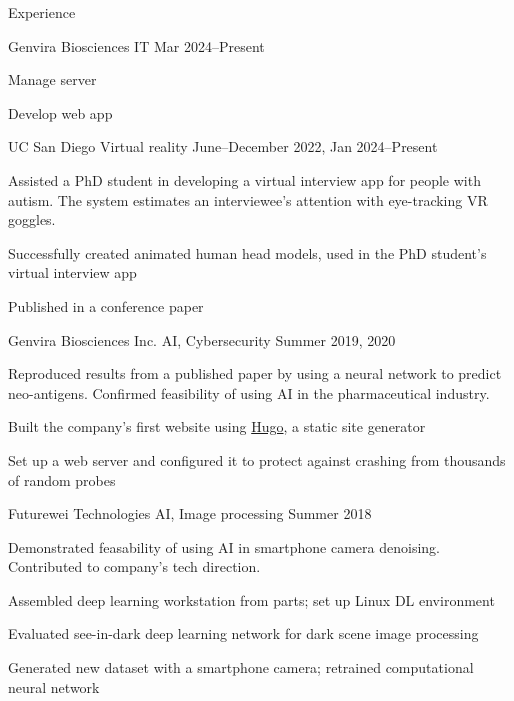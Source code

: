 	\begin{rSection}{Experience}

		\begin{rSubsection}{Genvira Biosciences} {IT} {Mar 2024--Present} %
			\item Manage server
			\item Develop web app
		\end{rSubsection}

		\begin{rSubsection}{UC San Diego} {Virtual reality} {June--December 2022, Jan 2024--Present} %
			\item Assisted a PhD student in developing a virtual interview app for people with autism. The system estimates an interviewee's attention with eye-tracking VR goggles.
			\item Successfully created animated human head models, used in the PhD student's virtual interview app
			\item Published in a conference paper
		\end{rSubsection}

		\begin{rSubsection}{Genvira Biosciences Inc.} {AI, Cybersecurity} {Summer 2019, 2020}
			\item Reproduced results from a published paper by using a neural network to predict neo-antigens. Confirmed feasibility of using AI in the pharmaceutical industry.
			\item Built the company's first website using \href{https://gohugo.io/}{Hugo}, a static site generator
			\item Set up a web server and configured it to protect against crashing from thousands of random probes
		\end{rSubsection}

		\begin{rSubsection}{Futurewei Technologies} {AI, Image processing} {Summer 2018}
			\item Demonstrated feasability of using AI in smartphone camera denoising. Contributed to company's tech direction.
			\item Assembled deep learning workstation from parts; set up Linux DL environment
			\item Evaluated see-in-dark deep learning network for dark scene image processing
			\item Generated new dataset with a smartphone camera; retrained computational neural network
		\end{rSubsection}

	\end{rSection}

